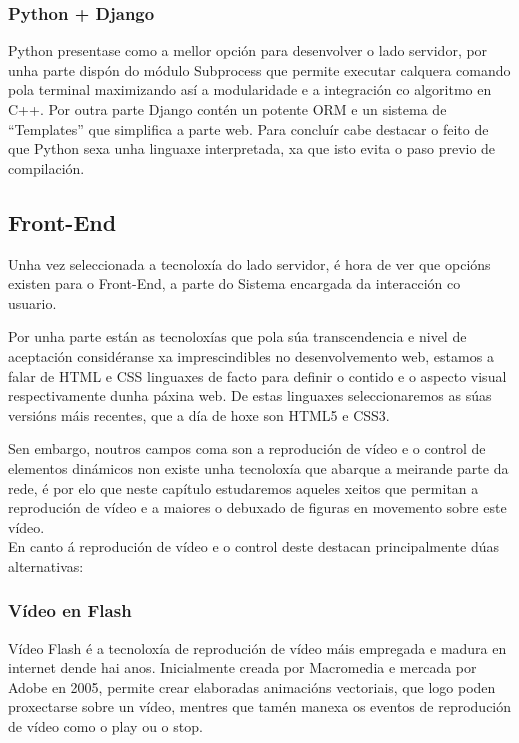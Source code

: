         \subsubsection{Python + Django}
        Python presentase como a mellor opción para desenvolver o lado servidor, por unha parte
        dispón do módulo Subprocess\cite{subprocess-module-url} que permite executar calquera
        comando pola terminal maximizando así a modularidade e a integración co algoritmo en C++.
        Por outra parte Django\cite{django-web-page-url} contén un potente ORM e un sistema de 
        ``Templates'' que simplifica a parte web. Para concluír cabe destacar o feito de que 
        Python sexa unha linguaxe interpretada, xa que isto evita o paso previo de compilación.
        
        
    \subsection{Front-End}
        Unha vez seleccionada a tecnoloxía do lado servidor, é hora de ver que opcións existen para
        o Front-End, a parte do Sistema encargada da interacción co usuario.
        
        Por unha parte están as tecnoloxías que pola súa transcendencia e nivel de aceptación
        considéranse xa imprescindibles no desenvolvemento web, estamos a falar de HTML e CSS linguaxes
        de facto para definir o contido e o aspecto visual respectivamente dunha páxina web.
        De estas linguaxes seleccionaremos as súas versións máis recentes, que a día de hoxe son HTML5 e
        CSS3.
        
        Sen embargo, noutros campos coma son a reprodución de vídeo e o control de elementos dinámicos
        non existe unha tecnoloxía que abarque a meirande parte da rede, é por elo que neste capítulo
        estudaremos aqueles xeitos que permitan a reprodución de vídeo e a maiores o debuxado de 
        figuras en movemento sobre este vídeo.\\
        
        En canto á reprodución de vídeo e o control deste destacan principalmente dúas alternativas:
        
        \subsubsection{Vídeo en Flash}
            Vídeo Flash é a tecnoloxía de reprodución de vídeo máis empregada e madura en
            internet dende hai anos. Inicialmente creada por Macromedia e mercada por Adobe 
            en 2005, permite crear elaboradas animacións vectoriais, que logo poden proxectarse
            sobre un vídeo, mentres que tamén manexa os eventos de reprodución de vídeo como o 
            play ou o stop.
            
